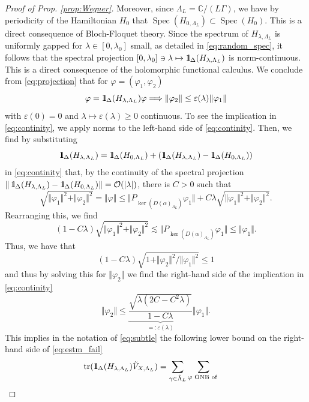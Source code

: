 \documentclass[reqno,12pt,letterpaper]{amsart}
\let\epsilon=\varepsilon %
\newcommand{\CC}{{\mathbb C}}
\numberwithin{equation}{section}
\DeclareMathOperator{\Spec}{Spec}
\DeclareMathOperator{\tr}{tr}
\def\indic{\operatorname{1\hskip-2.75pt\relax l}}
\begin{document}
\begin{proof}[Proof of Prop. \ref{prop:Wegner}]
Moreover, since $\Lambda_L=\CC/(L\Gamma)$, we have by periodicity of the Hamiltonian $H_0$ that $\Spec(H_{0,\Lambda_L}) \subset \Spec(H_0).$ { This is a direct consequence of Bloch-Floquet theory.}  Since the spectrum of $H_{\lambda,\Lambda_L}${ is uniformly gapped for $\lambda \in [0,\lambda_0]$ small, as detailed in \eqref{eq:random_spec}}, it follows that the spectral projection $[0,\lambda_0]\ni \lambda \mapsto \indic_{\Delta}(H_{\lambda,\Lambda_L})$ is norm-continuous. { This is a direct consequence of the holomorphic functional calculus.} We conclude from \eqref{eq:projection} that for $\varphi = (\varphi_1,\varphi_2)$
\begin{equation}
\label{eq:continity}
 \varphi  = \indic_{\Delta}(H_{\lambda,\Lambda_L}) \varphi \Longrightarrow \Vert \varphi_2 \Vert \le \varepsilon(\lambda) \Vert \varphi_1 \Vert
 \end{equation}
with $\varepsilon(0) = 0$ and $\lambda \mapsto \epsilon(\lambda) \ge 0$ continuous. 
To see the implication in \eqref{eq:continity}, we apply norms to the left-hand side of \eqref{eq:continity}. Then, we find by substituting
\[\indic_{\Delta}(H_{\lambda,\Lambda_L}) = \indic_{\Delta}(H_{0,\Lambda_L})+ (\indic_{\Delta}(H_{\lambda,\Lambda_L})-\indic_{\Delta}(H_{0,\Lambda_L}))\]
in \eqref{eq:continity} that, { by the continuity of the spectral projection} $ \Vert \indic_{\Delta}(H_{\lambda,\Lambda_L})-\indic_{\Delta}(H_{0,\Lambda_L})\Vert = \mathcal O(\vert \lambda \vert)$, there is $C>0$ such that 
\[ \sqrt{\Vert \varphi_1 \Vert^2 + \Vert \varphi_2 \Vert^2} = \Vert \varphi\Vert  \le \Vert P_{\ker(D(\alpha)_{\Lambda_L})}\varphi_1 \Vert + C\lambda \sqrt{\Vert \varphi_1 \Vert^2 + \Vert \varphi_2 \Vert^2}.\]
Rearranging this, we find
\[(1-C\lambda) \sqrt{\Vert \varphi_1 \Vert^2 + \Vert \varphi_2 \Vert^2}  \lesssim \Vert P_{\ker(D(\alpha)_{\Lambda_L})}\varphi_1 \Vert  \le \Vert \varphi_1 \Vert.\]
Thus, we have that
\[(1-C\lambda) \sqrt{1+\Vert \varphi_2 \Vert^2/\Vert \varphi_1 \Vert^2} \le 1\]
and thus by solving this for $\Vert \varphi_2\Vert$ we find { the right-hand side of the implication in \eqref{eq:continity}
\[ \Vert \varphi_2 \Vert \le \underbrace{\frac{\sqrt{\lambda(2C-C^2\lambda)}}{1-C\lambda}}_{=:\varepsilon(\lambda)} \Vert \varphi_1 \Vert.\]
This implies in the notation of \eqref{eq:subtle} the following lower bound on the right-hand side of \eqref{eq:estm_fail}
\[ \begin{split}
\tr(  \indic_{\Delta}(H_{\lambda,\Lambda_L})\tilde V_{X,\Lambda_L} ) &= \sum_{\gamma \in \tilde\Lambda_L} \sum_{\substack{\varphi \text{ ONB of } \\
}}
\end{split}\]}
\end{proof}
\end{document}
